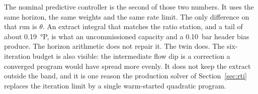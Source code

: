 The nominal predictive controller is the second of those two numbers. It uses the same horizon, the same weights and the same rate limit. The only difference on that run is $\theta$. An extract integral that matches the ratio station, and a tail of about \SI{0.19}{\degree}P, is what an uncommissioned capacity and a \SI{0.10}{bar} header bias produce. The horizon arithmetic does not repair it. The twin does. The six-iteration budget is also visible: the intermediate flow dip is a correction a converged program would have spread more evenly. It does not keep the extract outside the band, and it is one reason the production solver of Section~\ref{sec:rti} replaces the iteration limit by a single warm-started quadratic program.
